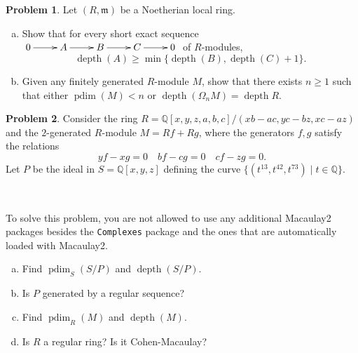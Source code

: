 \documentclass[11pt]{article}
\DeclareMathOperator{\depth}{depth}
\DeclareMathOperator{\pdim}{pdim}
\newcommand{\m}{\mathfrak{m}}
\theoremstyle{definition}
\newtheorem{problem}{Problem}
\begin{document}
\begin{problem}
	Let $(R,\m)$ be a Noetherian local ring.
	\begin{enumerate}[a)]
		\item Show that for every short exact sequence $\xymatrix{0 \ar[r] & A \ar[r] & B \ar[r] & C \ar[r] & 0}$ of $R$-modules,
		$$\depth(A) \geqslant \min \lbrace \depth(B), \depth(C) + 1 \rbrace.$$
		\item Given any finitely generated $R$-module $M$, show that there exists $n \geqslant 1$ such that either $\pdim(M) < n$ or $\depth(\Omega_n M) = \depth R$.
	\end{enumerate}
\end{problem}


\newpage

\setcounter{problem}{6}

\begin{problem}
	Consider the ring $R = \mathbb{Q}[x,y,z,a,b,c]/(xb-ac,yc-bz,xc-az)$ and the $2$-generated $R$-module $M = Rf + Rg$, where the generators $f, g$ satisfy the relations 
		$$yf-xg = 0 \quad bf - cg = 0 \quad cf - zg = 0.$$
		Let $P$ be the ideal in $S = \mathbb{Q}[x,y,z]$ defining the curve $\lbrace (t^{13},t^{42},t^{73}) \mid t \in \mathbb{Q} \rbrace$.

\

To solve this problem, you are not allowed to use any additional Macaulay2 packages besides the \texttt{Complexes} package and the ones that are automatically loaded with Macaulay2.

\begin{enumerate}[a)]
	\item Find $\pdim_S(S/P)$ and $\depth(S/P)$. 
	\item Is $P$ generated by a regular sequence?
	\item Find $\pdim_R(M)$ and $\depth(M)$.
	\item Is $R$ a regular ring? Is it Cohen-Macaulay?
\end{enumerate}
\end{problem}
\end{document}
